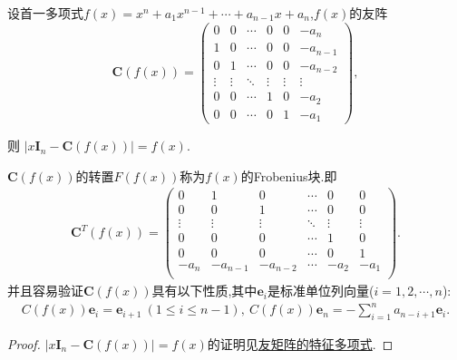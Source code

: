 \documentclass[../../main.tex]{subfiles}
\begin{document}
\begin{proposition}[多项式的友矩阵和Frobenius块]\label{proposition:多项式的友矩和Frobenius块}
设首一多项式\(f(x)=x^{n}+a_{1}x^{n - 1}+\cdots+a_{n - 1}x + a_{n}\),\(f(x)\)的友阵
\[
\boldsymbol{C}(f(x))=\left(\begin{array}{cccccc}
0 & 0 & \cdots & 0 & 0 & -a_{n} \\
1 & 0 & \cdots & 0 & 0 & -a_{n - 1} \\
0 & 1 & \cdots & 0 & 0 & -a_{n - 2} \\
\vdots & \vdots & \ddots & \vdots & \vdots & \vdots \\
0 & 0 & \cdots & 1 & 0 & -a_{2} \\
0 & 0 & \cdots & 0 & 1 & -a_{1}
\end{array}\right),
\]

则
\(\vert x\boldsymbol{I}_{n}-\boldsymbol{C}(f(x))\vert=f(x)\).

\(\boldsymbol{C}(f(x))\)的转置\(F(f(x))\)称为\(f(x)\)的Frobenius块.即
\begin{align*}
\boldsymbol{C}^T(f(x))=\left( \begin{matrix}
0&		1&		0&		\cdots&		0&		0\\
0&		0&		1&		\cdots&		0&		0\\
\vdots&		\vdots&		\vdots&		\ddots&		\vdots&		\vdots\\
0&		0&		0&		\cdots&		1&		0\\
0&		0&		0&		\cdots&		0&		1\\
-a_n&		-a_{n-1}&		-a_{n-2}&		\cdots&		-a_2&		-a_1\\
\end{matrix} \right).
\end{align*}
并且容易验证$\boldsymbol{C}(f(x))$具有以下性质,其中$\boldsymbol{e}_i$是标准单位列向量($i=1,2,\cdots,n$):
\begin{align*}
C(f(x))\boldsymbol{e}_i = \boldsymbol{e}_{i + 1} \ (1 \leq i \leq n - 1), \ C(f(x))\boldsymbol{e}_n = - \sum_{i = 1}^{n} a_{n - i + 1} \boldsymbol{e}_i .
\end{align*}
\end{proposition}
\begin{proof}
\(\vert x\boldsymbol{I}_{n}-\boldsymbol{C}(f(x))\vert=f(x)\)的证明见\hyperref[proposition:多项式的友阵的特征多项式与特征值]{友矩阵的特征多项式}.
\end{proof}
\end{document}
